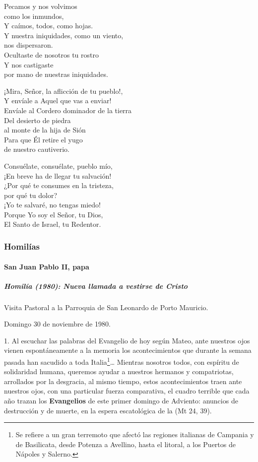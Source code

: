 \documentclass[]{article}
\let\oldparagraph\paragraph
\renewcommand{\paragraph}[1]{\oldparagraph{#1}\mbox{}}
\let\oldsubparagraph\subparagraph
\renewcommand{\subparagraph}[1]{\oldsubparagraph{#1}\mbox{}}
\begin{document}
Pecamos y nos volvimos\\ como los inmundos,\\ Y caímos, todos, como hojas.\\ Y nuestra iniquidades, como un viento,\\ nos dispersaron.\\ Ocultaste de nosotros tu rostro\\ Y nos castigaste\\ por mano de nuestras iniquidades.

¡Mira, Señor, la aflicción de tu pueblo!,\\ Y envíale a Aquel que vas a enviar!\\ Envíale al Cordero dominador de la tierra\\ Del desierto de piedra\\ al monte de la hija de Sión\\ Para que Él retire el yugo\\ de nuestro cautiverio.

Consuélate, consuélate, pueblo mío,\\ ¡En breve ha de llegar tu salvación!\\ ¿Por qué te consumes en la tristeza,\\ por qué tu dolor?\\ ¡Yo te salvaré, no tengas miedo!\\ Porque Yo soy el Señor, tu Dios,\\ El Santo de Israel, tu Redentor.\strut



\subsubsection{Homilías}\label{homiluxedas}

\paragraph{San Juan Pablo II, papa}\label{san-juan-pablo-ii-papa}

\subparagraph{Homilía (1980): Nueva llamada a vestirse de 	Cristo}\label{homiluxeda-nueva-llamada-a-vestirse-de-cristo}

Visita Pastoral a la Parroquia de San Leonardo de Porto Mauricio.

Domingo 30 de noviembre de 1980.

1. Al escuchar las palabras del Evangelio de hoy según Mateo, ante nuestros ojos vienen espontáneamente a la memoria los acontecimientos que durante la semana pasada han sacudido a toda Italia\footnote{Se 	refiere a un gran terremoto que afectó las regiones italianas de 	Campania y de Basilicata, desde Potenza a Avellino, hasta el litoral, 	a los Puertos de Nápoles y Salerno.}\ldots{} Mientras nosotros todos, con espíritu de solidaridad humana, queremos ayudar a nuestros hermanos y compatriotas, arrollados por la desgracia, al mismo tiempo, estos acontecimientos traen ante nuestros ojos, con una particular fuerza comparativa, el cuadro terrible que cada año trazan los \textbf{Evangelios} de este primer domingo de Adviento: anuncios de destrucción y de muerte, en la espera escatológica de la  (Mt 24, 39).
\end{document}
